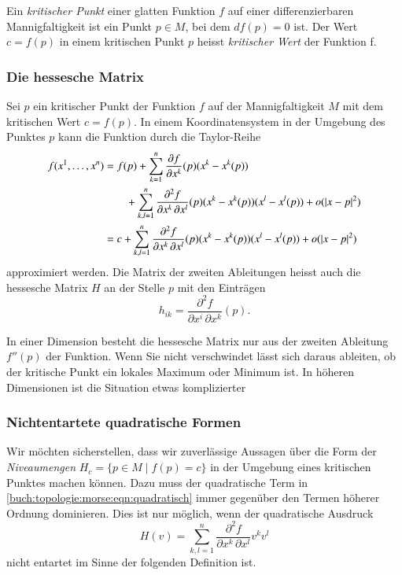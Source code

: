 \begin{definition}
%
%
%
%
Ein \emph{kritischer Punkt} einer glatten Funktion $f$ auf einer
differenzierbaren Mannigfaltigkeit ist ein Punkt $p\in M$, bei dem
$df(p)=0$ ist.
Der Wert $c=f(p)$ in einem kritischen Punkt $p$ heisst
\emph{kritischer Wert} der Funktion f.
\end{definition}

%
%
\subsubsection{Die hessesche Matrix}
Sei $p$ ein kritischer Punkt der Funktion $f$ auf der Mannigfaltigkeit $M$
mit dem kritischen Wert $c=f(p)$.
In einem Koordinatensystem in der Umgebung des Punktes $p$ kann die Funktion
durch die Taylor-Reihe 
\begin{align}
f(x^1,\dots,x^n)
&=
f(p)
+
\sum_{k=1}^n \frac{\partial f}{\partial x^k}(p) (x^k-x^k(p))
\\
&\qquad\mathstrut
+
\sum_{k,l=1}^n
\frac{\partial^2 f}{\partial x^k\,\partial x^l}(p)
(x^k-x^k(p))(x^l-x^l(p))
+
o(|x-p|^2)
\notag
\\
&=
c
+
\sum_{k,l=1}^n
\frac{\partial^2 f}{\partial x^k\,\partial x^l}(p)
(x^k-x^k(p))(x^l-x^l(p))
+
o(|x-p|^2)
\label{buch:topologie:morse:eqn:quadratisch}
\end{align}
approximiert werden.
Die Matrix der zweiten Ableitungen heisst auch die hessesche Matrix $H$
an der Stelle $p$ mit den Einträgen
\[
h_{ik}
=
\frac{\partial^2 f}{\partial x^i\,\partial x^k}(p).
\]

In einer Dimension besteht die hessesche Matrix nur aus der zweiten
Ableitung $f''(p)$ der Funktion.
Wenn Sie nicht verschwindet lässt sich daraus ableiten, ob der
kritische Punkt ein lokales Maximum oder Minimum ist.
In höheren Dimensionen ist die Situation etwas komplizierter

%
%
\subsubsection{Nichtentartete quadratische Formen}
Wir möchten sicherstellen, dass wir zuverlässige Aussagen über die
Form der \emph{Niveaumengen} $H_c=\{p\in M\mid f(p)=c\}$ in der
Umgebung eines kritischen Punktes machen können.
Dazu muss der quadratische Term in
\eqref{buch:topologie:morse:eqn:quadratisch}
immer gegenüber den Termen höherer Ordnung dominieren.
Dies ist nur möglich, wenn der quadratische Ausdruck
\[
H(v)
=
\sum_{k,l=1}^n
\frac{\partial^2 f}{\partial x^k\,\partial x^l}
v^k v^l
\]
nicht entartet im Sinne der folgenden Definition ist.

